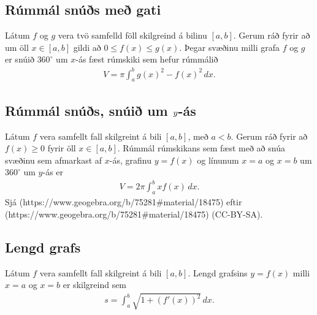 \documentclass[b5paper,10pt,icelandic]{sphinxmanual}
\begin{document}

\subsection{Rúmmál snúðs með gati}
\label{\detokenize{kafli07:rummal-snus-me-gati}}\label{\detokenize{kafli07:index-4}}
Látum \(f\) og \(g\) vera tvö samfelld föll skilgreind á bilinu
\([a, b]\). Gerum ráð fyrir að um öll \(x\in [a, b]\) gildi að
\(0\leq f(x)\leq
g(x)\). Þegar svæðinu milli grafa \(f\) og \(g\) er snúið
\(360^\circ\) um \(x\)-ás fæst rúmskiki sem hefur rúmmálið
\begin{equation*}
\begin{split}V=\pi\int_a^b g(x)^2-f(x)^2\,dx.\end{split}
\end{equation*}

\subsection{Rúmmál snúðs, snúið um \protect\(y\protect\)-ás}
\label{\detokenize{kafli07:index-5}}\label{\detokenize{kafli07:id1}}
Látum \(f\) vera samfellt fall skilgreint á bili \([a, b]\), með
\(a<b\). Gerum ráð fyrir að \(f(x)\geq 0\) fyrir öll
\(x\in [a, b]\). Rúmmál rúmskikans sem fæst með að snúa svæðinu sem
afmarkast af \(x\)-ás, grafinu \(y=f(x)\) og línunum \(x=a\)
og \(x=b\) um \(360^\circ\) um \(y\)-ás er
\begin{equation*}
\begin{split}V=2\pi\int_a^b xf(x)\,dx.\end{split}
\end{equation*}
Sjá  (https://www.geogebra.org/b/75281\#material/18475)
eftir  (https://www.geogebra.org/b/75281\#material/18475) (CC-BY-SA).


\subsection{Lengd grafs}
\label{\detokenize{kafli07:lengd-grafs}}
Látum \(f\) vera samfellt fall skilgreint á bili \([a, b]\).
Lengd grafsins \(y=f(x)\) milli \(x=a\) og \(x=b\) er
skilgreind sem
\begin{equation*}
\begin{split}s=\int_a^b\sqrt{1+(f'(x))^2}\,dx.\end{split}
\end{equation*}
\end{document}
